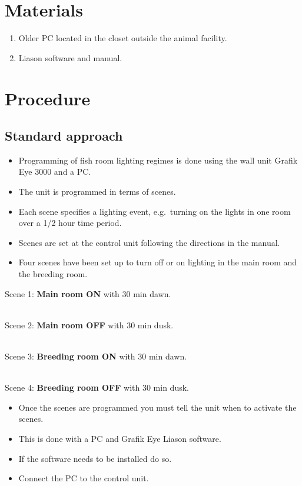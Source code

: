 \documentclass[
  letterpaper,
  DIV=11,
  numbers=noendperiod]{scrreprt}
\providecommand{\tightlist}{%
  \setlength{\itemsep}{0pt}\setlength{\parskip}{0pt}}\usepackage{longtable,booktabs,array}
\begin{document}
\hypertarget{materials-21}{%
\section{Materials}\label{materials-21}}

\begin{enumerate}
\def\labelenumi{\arabic{enumi}.}
\setcounter{enumi}{1}
\tightlist
\item
  Older PC located in the closet outside the animal facility.
\item
  Liason software and manual.
\end{enumerate}

\hypertarget{procedure-23}{%
\section{Procedure}\label{procedure-23}}

\hypertarget{standard-approach}{%
\subsection{Standard approach}\label{standard-approach}}

\begin{itemize}
\tightlist
\item
  Programming of fish room lighting regimes is done using the wall unit
  Grafik Eye 3000 and a PC.
\item
  The unit is programmed in terms of scenes.
\item
  Each scene specifies a lighting event, e.g.~turning on the lights in
  one room over a 1/2 hour time period.
\item
  Scenes are set at the control unit following the directions in the
  manual.
\item
  Four scenes have been set up to turn off or on lighting in the main
  room and the breeding room.
\end{itemize}

Scene 1: \textbf{Main room ON} with 30 min dawn.\\
\strut \\
Scene 2: \textbf{Main room OFF} with 30 min dusk.\\
\strut \\
Scene 3: \textbf{Breeding room ON} with 30 min dawn.\\
\strut \\
Scene 4: \textbf{Breeding room OFF} with 30 min dusk.

\begin{itemize}
\tightlist
\item
  Once the scenes are programmed you must tell the unit when to activate
  the scenes.
\item
  This is done with a PC and Grafik Eye Liason software.
\item
  If the software needs to be installed do so.
\item
  Connect the PC to the control unit.
\end{itemize}
\end{document}
